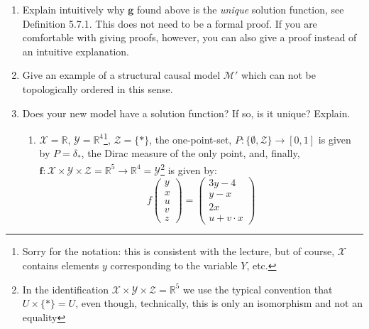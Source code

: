 \begin{enumerate}
\begin{enumerate}
	Finally, formally verify that it is a solution function by showing that the structural equation $\boldsymbol{g}(\boldsymbol{x}, \boldsymbol{z}) = \boldsymbol{f}(\boldsymbol{x}, \boldsymbol{g}(\boldsymbol{x}, \boldsymbol{z}), \boldsymbol{z})$ is satisfied for all $\boldsymbol{x} \in \boldsymbol{\mathcal{X}}$ and almost all $\boldsymbol{z} \in \boldsymbol{\mathcal{Z}}$.
	\item Explain intuitively why $\boldsymbol{g}$ found above is the \emph{unique} solution function, see Definition 5.7.1. This does not need to be a formal proof.
	If you are comfortable with giving proofs, however, you can also give a proof instead of an intuitive explanation.
	\item Give an example of a structural causal model $\mathcal{M}'$ which can not be topologically ordered in this sense. 
	\item Does your new model have a solution function? If so, is it unique? Explain.
	\begin{gradedsolution}
		\begin{enumerate}
			\item $\boldsymbol{\mathcal{X}} = \mathbb{R}$, $\boldsymbol{\mathcal{Y}} = \mathbb{R}^{4}$\footnote{Sorry for the notation: this is consistent with the lecture, but of course, $\mathbf{\mathcal{X}}$ contains elements $y$ corresponding to the variable $Y$, etc.}, $\boldsymbol{\mathcal{Z}} = \{*\}$, the one-point-set, $P: \{\emptyset, \boldsymbol{\mathcal{Z}}\} \to [0,1]$ is given by $P = \delta_{*}$, the Dirac measure of the only point, and, finally, $\boldsymbol{f}: \boldsymbol{\mathcal{X}} \times \boldsymbol{\mathcal{Y}} \times \boldsymbol{\mathcal{Z}} = \mathbb{R}^{5} \to \mathbb{R}^{4} = \boldsymbol{\mathcal{Y}}$\footnote{In the identification $\boldsymbol{\mathcal{X}} \times \boldsymbol{\mathcal{Y}} \times \boldsymbol{\mathcal{Z}} = \mathbb{R}^{5}$ we use the typical convention that $U \times \{*\} = U$, even though, technically, this is only an isomorphism and not an equality} is given by:
			\begin{equation}
		f \begin{pmatrix} y \\ x \\ u \\ v \\ z\end{pmatrix}
		= \begin{pmatrix} 3y - 4 \\ y - x \\ 2x \\ u + v \cdot x\end{pmatrix}

\end{equation}
\end{enumerate}
\end{gradedsolution}
\end{enumerate}
\end{enumerate}
